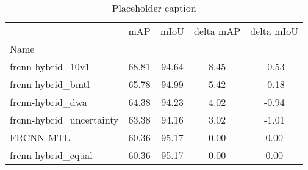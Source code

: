 \begin{table}[htbp]
\centering
\caption{Placeholder caption}
\label{tab:weighting}
\begin{tabular}{lcccc}
\toprule
 & mAP & mIoU & delta mAP & delta mIoU \\
Name &  &  &  &  \\
\midrule
frcnn-hybrid_10v1 & 68.81 & 94.64 & 8.45 & -0.53 \\
frcnn-hybrid_bmtl & 65.78 & 94.99 & 5.42 & -0.18 \\
frcnn-hybrid_dwa & 64.38 & 94.23 & 4.02 & -0.94 \\
frcnn-hybrid_uncertainty & 63.38 & 94.16 & 3.02 & -1.01 \\
FRCNN-MTL & 60.36 & 95.17 & 0.00 & 0.00 \\
frcnn-hybrid_equal & 60.36 & 95.17 & 0.00 & 0.00 \\
\bottomrule
\end{tabular}
\end{table}
